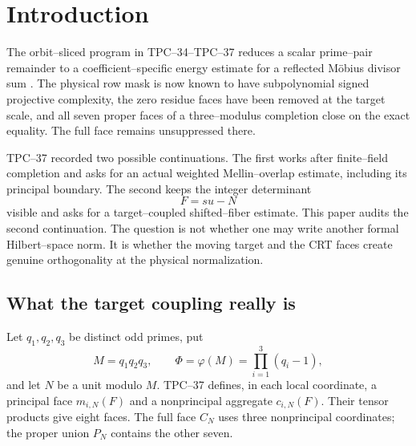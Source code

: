 \section{Introduction}
\label{sec:tpc38-introduction}

The orbit--sliced program in TPC--34--TPC--37 reduces a scalar prime--pair
remainder to a coefficient--specific energy estimate for a reflected
M\"obius divisor sum \citep{WangTPC34,WangTPC35,WangTPC36,WangTPC37}.
The physical row mask is now known to have subpolynomial signed projective
complexity, the zero residue faces have been removed at the target scale,
and all seven proper faces of a three--modulus completion close on the
exact equality.  The full face remains unsuppressed there.

TPC--37 recorded two possible continuations.  The first works after
finite--field completion and asks for an actual weighted Mellin--overlap
estimate, including its principal boundary.  The second keeps the integer
determinant
\begin{equation}
 F=su-N
 \label{eq:tpc38-intro-determinant}
\end{equation}
visible and asks for a target--coupled shifted--fiber estimate.  This paper
audits the second continuation.  The question is not whether one may write
another formal Hilbert--space norm.  It is whether the moving target and
the CRT faces create genuine orthogonality at the physical normalization.

\subsection{What the target coupling really is}

Let \(q_1,q_2,q_3\) be distinct odd primes, put
\begin{equation}
 M=q_1q_2q_3,\qquad
 \Phi=\varphi(M)=\prod_{i=1}^3(q_i-1),
 \label{eq:tpc38-intro-M-Phi}
\end{equation}
and let \(N\) be a unit modulo \(M\).  TPC--37 defines, in each local
coordinate, a principal face \(m_{i,N}(F)\) and a nonprincipal aggregate
\(c_{i,N}(F)\).  Their tensor products give eight faces.  The full face
\(C_N\) uses three nonprincipal coordinates; the proper union \(P_N\)
contains the other seven.

